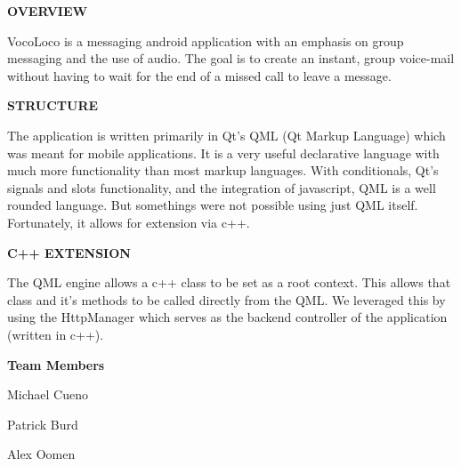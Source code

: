 {\bfseries O\-V\-E\-R\-V\-I\-E\-W}

Voco\-Loco is a messaging android application with an emphasis on group messaging and the use of audio. The goal is to create an instant, group voice-\/mail without having to wait for the end of a missed call to leave a message.

{\bfseries S\-T\-R\-U\-C\-T\-U\-R\-E}

The application is written primarily in Qt's Q\-M\-L (Qt Markup Language) which was meant for mobile applications. It is a very useful declarative language with much more functionality than most markup languages. With conditionals, Qt's signals and slots functionality, and the integration of javascript, Q\-M\-L is a well rounded language. But somethings were not possible using just Q\-M\-L itself. Fortunately, it allows for extension via c++.

{\bfseries C++ E\-X\-T\-E\-N\-S\-I\-O\-N}

The Q\-M\-L engine allows a c++ class to be set as a root context. This allows that class and it's methods to be called directly from the Q\-M\-L. We leveraged this by using the Http\-Manager which serves as the backend controller of the application (written in c++).

{\bfseries Team Members} 
\begin{DoxyItemize}
\item Michael Cueno 
\item Patrick Burd 
\item Alex Oomen 
\end{DoxyItemize}